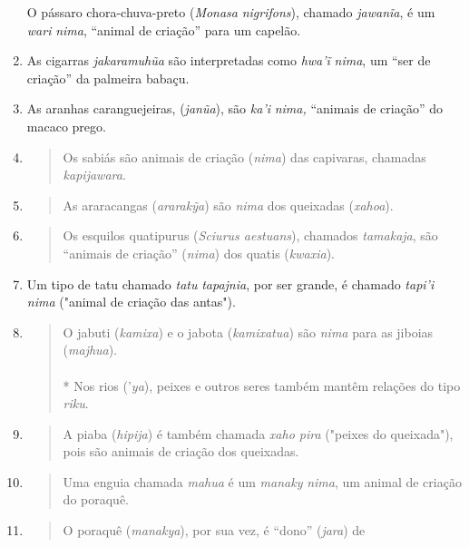 \begin{enumerate}
  O pássaro chora-chuva-preto (\emph{Monasa} \emph{nigrifons}), chamado
  \emph{jawanĩa}, é um \emph{wari} \emph{nima}, ``animal de criação''
  para um capelão.
\item
  As cigarras \emph{jakaramuhũa} são interpretadas como \emph{hwa'ĩ}
  \emph{nima}, um ``ser de criação'' da palmeira babaçu.
\item
  As aranhas caranguejeiras, (\emph{janũa}), são \emph{ka'i}
  \emph{nima,} ``animais de criação'' do macaco prego.
\item
  \begin{quote}
  Os sabiás são animais de criação (\emph{nima}) das capivaras, chamadas
  \emph{kapijawara}.
  \end{quote}
\item
  \begin{quote}
  As araracangas (\emph{ararakỹa}) são \emph{nima} dos queixadas
  (\emph{xahoa}).
  \end{quote}
\item
  \begin{quote}
  Os esquilos quatipurus (\emph{Sciurus aestuans}), chamados
  \emph{tamakaja}, são ``animais de criação'' (\emph{nima}) dos quatis
  (\emph{kwaxia}).
  \end{quote}
\item
  Um tipo de tatu chamado \emph{tatu} \emph{tapajnia}, por ser grande, é
  chamado \emph{tapi'i} \emph{nima} ("animal de criação das antas").
\item
  \begin{quote}
  O jabuti (\emph{kamixa}) e o jabota (\emph{kamixatua}) são \emph{nima}
  para as jiboias (\emph{majhua}).\\
  ~\\
  * Nos rios ('\emph{ya}), peixes e outros seres também mantêm relações
  do tipo \emph{riku}.
  \end{quote}
\item
  \begin{quote}
  A piaba (\emph{hipija}) é também chamada \emph{xaho pira} ("peixes do
  queixada"), pois são animais de criação dos queixadas.
  \end{quote}
\item
  \begin{quote}
  Uma enguia chamada \emph{mahua} é um \emph{manaky} \emph{nima}, um
  animal de criação do poraquê.
  \end{quote}
\item
  \begin{quote}
  O poraquê (\emph{manakya}), por sua vez, é ``dono'' (\emph{jara}) de

\end{quote}
\end{enumerate}
